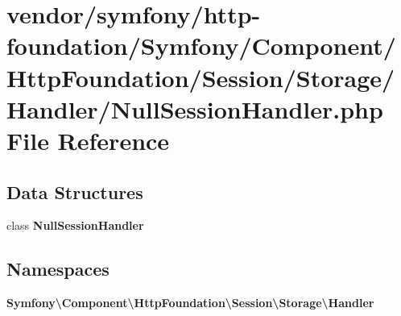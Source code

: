 \section{vendor/symfony/http-\/foundation/\+Symfony/\+Component/\+Http\+Foundation/\+Session/\+Storage/\+Handler/\+Null\+Session\+Handler.php File Reference}
\label{_null_session_handler_8php}
\subsection*{Data Structures}
\begin{DoxyCompactItemize}
\item 
class {\bf Null\+Session\+Handler}
\end{DoxyCompactItemize}
\subsection*{Namespaces}
\begin{DoxyCompactItemize}
\item 
 {\bf Symfony\textbackslash{}\+Component\textbackslash{}\+Http\+Foundation\textbackslash{}\+Session\textbackslash{}\+Storage\textbackslash{}\+Handler}
\end{DoxyCompactItemize}
